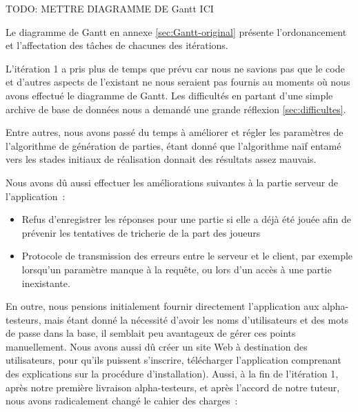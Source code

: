 \documentclass[a4paper,11pt,french]{article}
\begin{document}
TODO: METTRE DIAGRAMME DE Gantt ICI 
 
Le diagramme de Gantt en annexe \ref{sec:Gantt-original} présente l'ordonancement et l'affectation des tâches de chacunes des itérations.

L'itération 1 a pris plus de temps que prévu car nous ne savions pas que le code et d'autres aspects de l'existant ne nous seraient pas fournis au moments où nous avons effectué le diagramme de Gantt. Les difficultés en partant d'une simple archive de base de données nous a demandé une grande réflexion \ref{sec:difficultes}.

Entre autres, nous avons passé du temps à améliorer et régler les paramètres de l'algorithme de génération de parties, étant donné que l'algorithme naïf entamé vers les stades initiaux de réalisation donnait des résultats assez mauvais.

Nous avons dû aussi effectuer les améliorations suivantes à la partie serveur de l'application~:
\begin{itemize}
\item Refus d'enregistrer les réponses pour une partie si elle a déjà été jouée afin de prévenir les tentatives de tricherie de la part des joueurs
\item Protocole de transmission des erreurs entre le serveur et le client, par exemple lorsqu'un paramètre manque à la requête, ou lors d'un accès à une partie inexistante.
\end{itemize}

En outre, nous pensions initialement fournir directement l'application aux alpha-testeurs, mais étant donné la nécessité d'avoir les noms d'utilisateurs
et des mots de passe dans la base, il semblait peu avantageux de gérer ces points manuellement. Nous avons aussi dû créer un site Web à destination
des utilisateurs, pour qu'ils puissent s'inscrire, télécharger l'application comprenant des explications sur la procédure d'installation). Aussi, à la fin de l'itération 1, après notre première livraison alpha-testeurs, et après l'accord de notre tuteur, nous avons radicalement changé le cahier des charges~:
\end{document}
